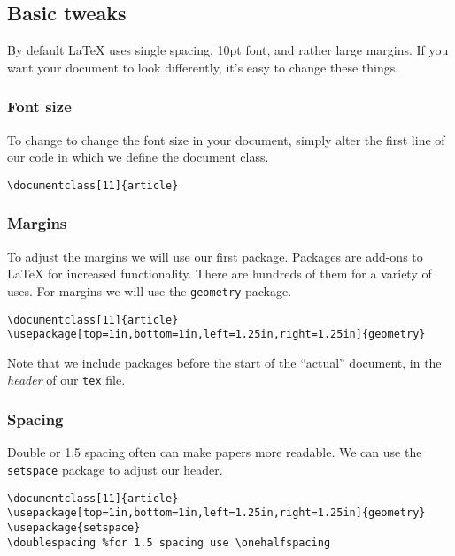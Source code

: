 \subsection{Basic tweaks}

By default \LaTeX{} uses single spacing, 10pt font, and rather large margins. If you want your document to look differently, it's easy to change these things.

\subsubsection*{Font size}

To change to change the font size in your document, simply alter the first line of our code in which we define the document class.

\begin{lstlisting}
\documentclass[11]{article}
\end{lstlisting}

\subsubsection*{Margins}

To adjust the margins we will use our first package. Packages are add-ons to \LaTeX{} for increased functionality. There are hundreds of them for a variety of uses. For margins we will use the \texttt{geometry} package.

\begin{lstlisting}
\documentclass[11]{article}
\usepackage[top=1in,bottom=1in,left=1.25in,right=1.25in]{geometry}
\end{lstlisting}

Note that we include packages before the start of the ``actual'' document, in the \textit{header} of our \texttt{tex} file.

\subsubsection*{Spacing}

Double or 1.5 spacing often can make papers more readable. We can use the \texttt{setspace} package to adjust our header.

\begin{lstlisting}
\documentclass[11]{article}
\usepackage[top=1in,bottom=1in,left=1.25in,right=1.25in]{geometry}
\usepackage{setspace}
\doublespacing %for 1.5 spacing use \onehalfspacing
\end{lstlisting}

